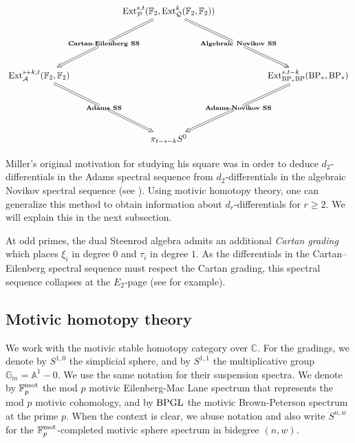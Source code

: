 
\begin{displaymath}
    \xymatrix{
  & & \Ext^{s,t}_{\P}(\F_2, \Ext_{\mathcal{Q}}^k(\F_2, \F_2)) \ar@{=>}[ddll]|{\mathbf{Cartan\textup{-}Eilenberg \ SS}} \ar@{=>}[ddrr]|{\mathbf{Algebraic \ Novikov \ SS}} & &  \\
  & & & & \\
 \Ext_{\A}^{s+k,t}(\F_2, \F_2) \ar@{=>}[ddrr]|{\mathbf{Adams \ SS}} & & & & \Ext^{s,t-k}_{\BP_*\BP}(\BP_*,\BP_*) \ar@{=>}[ddll]|{\mathbf{Adams\textup{-}Novikov \ SS}}\\
  & & & & \\
  & & \pi_{t-s-k}S^0  & &
    }
\end{displaymath}

\begin{rmk}
  Miller's original motivation for studying his square was in order to deduce $d_2$-differentials in the Adams spectral sequence from $d_2$-differentials in the algebraic Novikov spectral sequence (see \cite{MillerSquare}). Using motivic homotopy theory, one can generalize this method to obtain information about $d_r$-differentials for $r \geq 2$. We will explain this in the next subsection.
\end{rmk}

\begin{rmk}
  At odd primes, the dual Steenrod algebra admits an additional \emph{Cartan grading} which places $\xi_i$ in degree $0$ and $\tau_i$ in degree $1$. As the differentials in the Cartan--Eilenberg spectral sequence must respect the Cartan grading, this spectral sequence collapses at the $E_2$-page (see \cite{RavenelGreenBook} for example).
\end{rmk}


\subsection{Motivic homotopy theory} \label{section2.2}   \hfill

We work with the motivic stable homotopy category over $\mathbb{C}$. For the gradings, we denote by $S^{1,0}$ the simplicial sphere, and by $S^{1,1}$ the multiplicative group $\mathbb{G}_m = \mathbb{A}^1 - 0$. We use the same notation for their suspension spectra. We denote by $\operatorname{\mathbb{F}}_p^{\textup{mot}}$ the mod $p$ motivic Eilenberg-Mac Lane spectrum that represents the mod $p$ motivic cohomology, and by $\textup{BPGL}$ the motivic Brown-Peterson spectrum at the prime $p$. When the context is clear, we abuse notation and also write $S^{n,w}$ for the $\operatorname{\mathbb{F}}_p^{\textup{mot}}$-completed motivic sphere spectrum in bidegree $(n,w)$. 

